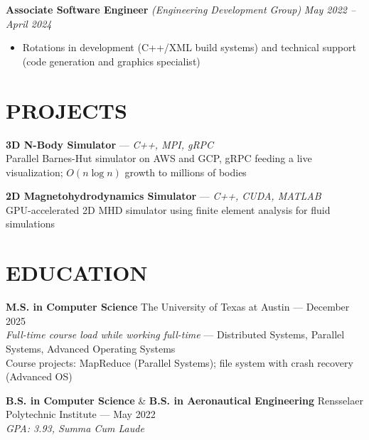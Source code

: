 \documentclass{article}
\begin{document}
{\large \textbf{Associate Software Engineer}} \textit{(Engineering Development Group)} \hfill \textit{May 2022 -- April 2024}
\begin{itemize}[leftmargin=*]
    \item Rotations in development (C++/XML build systems) and technical support (code generation and graphics specialist)
\end{itemize}

\section*{PROJECTS}
\textbf{3D N-Body Simulator} — \textit{C++, MPI, gRPC} \\
Parallel Barnes-Hut simulator on AWS and GCP, gRPC feeding a live visualization; $O(n \log n)$ growth to millions of bodies

\textbf{2D Magnetohydrodynamics Simulator} — \textit{C++, CUDA, MATLAB} \\
GPU-accelerated 2D MHD simulator using finite element analysis for fluid simulations

\section*{EDUCATION}
\textbf{M.S. in Computer Science} \hfill The University of Texas at Austin — December 2025 \\
\textit{Full-time course load while working full-time} — Distributed Systems, Parallel Systems, Advanced Operating Systems \\
Course projects: MapReduce (Parallel Systems); file system with crash recovery (Advanced OS)

\textbf{B.S. in Computer Science} \& \textbf{B.S. in Aeronautical Engineering} \hfill Rensselaer Polytechnic Institute — May 2022 \\
\textit{GPA: 3.93, Summa Cum Laude}
\end{document}
